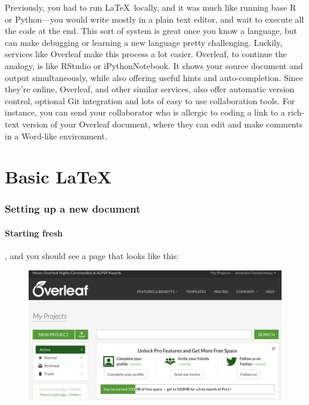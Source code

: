 \documentclass[12pt]{article}
\begin{document}
Previously, you had to run \LaTeX ~locally, and it was much like running base R or Python---you would write mostly in a plain text editor, and wait to execute all the code at the end. This sort of system is great once you know a language, but can make debugging or learning a new language pretty challenging. Luckily, services like Overleaf make this process a lot easier. Overleaf, to continue the analogy, is like RStudio or iPythonNotebook. It shows your source document and output simultaneously, while also offering useful hints and auto-completion. Since they're online, Overleaf, and other similar services, also offer automatic version control, optional Git integration and lots of easy to use collaboration tools. For instance, you can send your collaborator who is allergic to coding a link to a rich-text version of your Overleaf document, where they can edit and make comments in a Word-like environment.

\part{Basic \LaTeX}
\section{Setting up a new document}
\subsection{Starting fresh}
, and you should see a page that looks like this:
\begin{figure}[H]
\includegraphics[width=\textwidth]{Images/newproject.png}
\end{figure}
\end{document}
